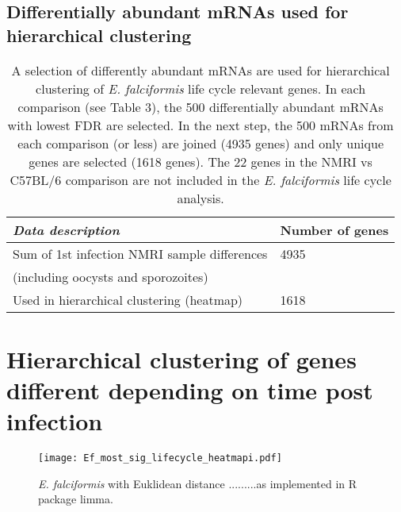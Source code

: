\documentclass{article}
\begin{document}
\subsection{Differentially abundant mRNAs used for hierarchical clustering}
\setlength{\tabcolsep}{10pt}
\begin{table}[H]
\begin{adjustwidth}{-10}{}
\begin{center}
	\caption{A selection of differently abundant mRNAs are used for hierarchical clustering of \textit{E. falciformis}
	life cycle relevant genes. In each comparison (see Table 3), the 500 differentially abundant mRNAs with lowest FDR
	are selected. In the next step, the 500 mRNAs from each comparison (or less) are joined (4935 genes) and only 
	unique genes are selected (1618 genes). The 22 genes in the NMRI vs C57BL/6 
	comparison are not included in the \textit{E. falciformis} life cycle analysis.}
\begin{tabular}{*2l}    \toprule
	\textit{Data description} & Number of genes \\ \midrule
	Sum of 1st infection NMRI sample differences	& 4935  \\ 
	(including oocysts and sporozoites)	\\	
	Used in hierarchical clustering (heatmap)  	& 1618 \\ 	\bottomrule	
\hline
\end{tabular}
\end{center}
\end{adjustwidth}
\end{table}
\section{Hierarchical clustering of genes different depending on time post infection}
\begin{figure}[H]
\begin{center}
\texttt{[image: Ef\_most\_sig\_lifecycle\_heatmapi.pdf]}  
	\caption{\textit{E. falciformis} with Euklidean distance .........as implemented in R package limma.}
\end{center}
\end{figure}
\end{document}

